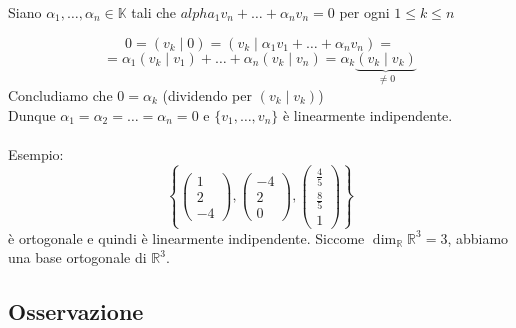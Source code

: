 \documentclass[12pt]{article}
\begin{document}
Siano $\alpha_1, \dots, \alpha_n \in \mathbb{K}$ tali che $alpha_1v_n + \dots + \alpha_nv_n = 0$ per ogni $1 \le k \le n$

\[0 = (v_k \mid 0) = (v_k \mid \alpha_1v_1 + \dots + \alpha_nv_n) = \]
\[= \alpha_1(v_k \mid v_1) + \dots + \alpha_n(v_k \mid v_n) = \alpha_k\underbrace{(v_k \mid v_k)}_{\neq 0}\]
Concludiamo che $0 = \alpha_k$ (dividendo per $(v_k \mid v_k)$)\\
Dunque $\alpha_1 = \alpha_2 = \dots = \alpha_n = 0$ e $\{v_1, \dots, v_n\}$ è linearmente indipendente.\\\\
Esempio:
\[\left\{\begin{pmatrix}
    1\\
    2\\
    -4
\end{pmatrix}, \begin{pmatrix}
    -4\\
    2\\
    0
\end{pmatrix}, \begin{pmatrix}
    \frac{4}{5}\\
    \frac{8}{5}\\
    1
\end{pmatrix}\right\}\]
è ortogonale e quindi è linearmente indipendente. Siccome $\dim_{\mathbb{R}}\mathbb{R}^3 = 3$, abbiamo una base ortogonale di $\mathbb{R}^3$.


\subsection{Osservazione}
\end{document}
